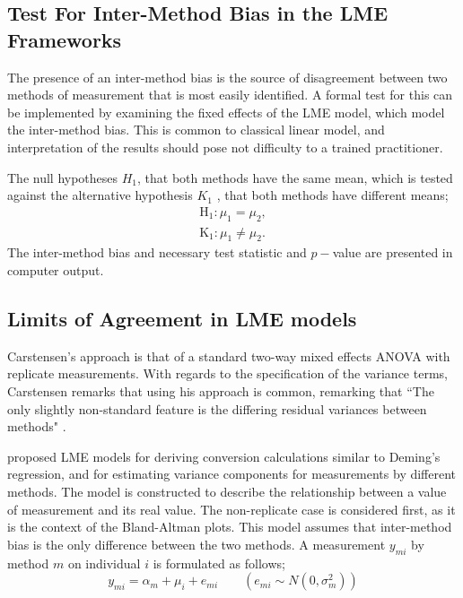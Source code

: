 \documentclass[12pt, a4paper]{report}
\theoremstyle{plain}
\theoremstyle{definition}
\theoremstyle{remark}
\begin{document}




\subsection{Test For Inter-Method Bias in the LME Frameworks}
The presence of an inter-method bias is the source of disagreement between two methods of measurement that is most easily identified. A formal test for this can be implemented by examining the fixed effects of the LME model, which model the inter-method bias. This is common to classical linear model, and interpretation of the results should pose not difficulty to a trained practitioner.

The null hypotheses $H_1$, that both methods have the same mean, which is tested against the alternative hypothesis $K_1$ , that both methods have different means;
\begin{eqnarray}
	\operatorname{H_1} : \mu_1 = \mu_2 ,\\
	\operatorname{K_1} : \mu_1 \neq \mu_2.
\end{eqnarray}
The inter-method bias and necessary test statistic and $p-$value are presented in computer output. 

\subsection{Limits of Agreement in LME models}

Carstensen's approach is that of a standard two-way mixed effects ANOVA with replicate measurements. With regards to the specification of the variance terms, Carstensen remarks that using his approach is common, remarking that ``The only slightly non-standard feature is the differing residual variances between methods" \citep{BXC2010}.

\citet{BXC2004} proposed LME models for deriving conversion calculations similar to Deming's regression, and for
estimating variance components for measurements by different methods. The model is constructed to
describe the relationship between a value of measurement and its real value. The non-replicate case is considered first, as it is
the context of the Bland-Altman plots. This model assumes that inter-method bias is the only difference between the two methods.
A measurement $y_{mi}$ by method $m$ on individual $i$ is formulated as follows;
\begin{equation}
y_{mi}  = \alpha_{m} + \mu_{i} + e_{mi} \qquad ( e_{mi} \sim
N(0,\sigma^{2}_{m}))
\end{equation}
\end{document}
